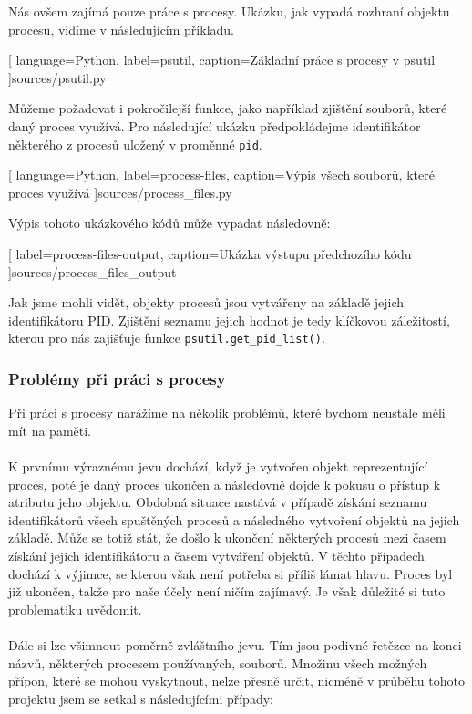 \documentclass[10pt,a4paper]{article}
\begin{document}
		Nás ovšem zajímá pouze práce s procesy. Ukázku, jak vypadá rozhraní objektu procesu, vidíme v následujícím příkladu.

		
		[
			language={Python},
			label=psutil,
			caption={Základní práce s procesy v psutil}
		]{sources/psutil.py}

		Můžeme požadovat i pokročilejší funkce, jako například zjištění souborů, které daný proces využívá. Pro následující ukázku předpokládejme identifikátor některého z procesů uložený v proměnné \texttt{pid}.

		
		[
			language={Python},
			label=process-files,
			caption={Výpis všech souborů, které proces využívá}
		]{sources/process_files.py}

		Výpis tohoto ukázkového kódů může vypadat následovně:

		
		[
			label=process-files-output,
			caption={Ukázka výstupu předchozího kódu}
		]{sources/process_files_output}

		Jak jsme mohli vidět, objekty procesů jsou vytvářeny na základě jejich identifikátoru PID\@. Zjištění seznamu jejich hodnot je tedy klíčkovou záležitostí, kterou pro nás zajišťuje funkce \texttt{psutil.get\_pid\_list()}.

		\subsubsection{Problémy při práci s procesy}
			Při práci s procesy narážíme na několik problémů, které bychom neustále měli mít na paměti.
			\\
			\\
			K prvnímu výraznému jevu dochází, když je vytvořen objekt reprezentující proces, poté je daný proces ukončen a následovně dojde k pokusu o přístup k atributu jeho objektu. Obdobná situace nastává v případě získání seznamu identifikátorů všech spuštěných procesů a následného vytvoření objektů na jejich základě. Může se totiž stát, že došlo k ukončení některých procesů mezi časem získání jejich identifikátoru a časem vytváření objektů. V těchto případech dochází k výjimce, se kterou však není potřeba si příliš lámat hlavu. Proces byl již ukončen, takže pro naše účely není ničím zajímavý. Je však důležité si tuto problematiku uvědomit.
			\\
			\\
			Dále si lze všimnout poměrně zvláštního jevu. Tím jsou podivné řetězce na konci názvů, některých procesem používaných, souborů. Množinu všech možných přípon, které se mohou vyskytnout, nelze přesně určit, nicméně v průběhu tohoto projektu jsem se setkal s následujícími případy:
\end{document}
